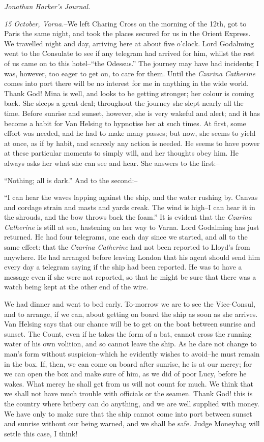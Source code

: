 \documentclass[12pt,openright]{book}
\begin{document}
\textit{Jonathan Harker’s Journal.}

\textit{15 October, Varna.}–We left Charing Cross on the morning of the 12th, got to Paris the same night, and took the places secured for us in the Orient Express. We travelled night and day, arriving here at about five o’clock. Lord Godalming went to the Consulate to see if any telegram had arrived for him, whilst the rest of us came on to this hotel–“the Odessus.” The journey may have had incidents; I was, however, too eager to get on, to care for them. Until the \textit{Czarina Catherine} comes into port there will be no interest for me in anything in the wide world. Thank God! Mina is well, and looks to be getting stronger; her colour is coming back. She sleeps a great deal; throughout the journey she slept nearly all the time. Before sunrise and sunset, however, she is very wakeful and alert; and it has become a habit for Van Helsing to hypnotise her at such times. At first, some effort was needed, and he had to make many passes; but now, she seems to yield at once, as if by habit, and scarcely any action is needed. He seems to have power at these particular moments to simply will, and her thoughts obey him. He always asks her what she can see and hear. She answers to the first:–

“Nothing; all is dark.” And to the second:–

“I can hear the waves lapping against the ship, and the water rushing by. Canvas and cordage strain and masts and yards creak. The wind is high–I can hear it in the shrouds, and the bow throws back the foam.” It is evident that the \textit{Czarina Catherine} is still at sea, hastening on her way to Varna. Lord Godalming has just returned. He had four telegrams, one each day since we started, and all to the same effect: that the \textit{Czarina Catherine} had not been reported to Lloyd’s from anywhere. He had arranged before leaving London that his agent should send him every day a telegram saying if the ship had been reported. He was to have a message even if she were not reported, so that he might be sure that there was a watch being kept at the other end of the wire.

We had dinner and went to bed early. To-morrow we are to see the Vice-Consul, and to arrange, if we can, about getting on board the ship as soon as she arrives. Van Helsing says that our chance will be to get on the boat between sunrise and sunset. The Count, even if he takes the form of a bat, cannot cross the running water of his own volition, and so cannot leave the ship. As he dare not change to man’s form without suspicion–which he evidently wishes to avoid–he must remain in the box. If, then, we can come on board after sunrise, he is at our mercy; for we can open the box and make sure of him, as we did of poor Lucy, before he wakes. What mercy he shall get from us will not count for much. We think that we shall not have much trouble with officials or the seamen. Thank God! this is the country where bribery can do anything, and we are well supplied with money. We have only to make sure that the ship cannot come into port between sunset and sunrise without our being warned, and we shall be safe. Judge Moneybag will settle this case, I think!
\end{document}
